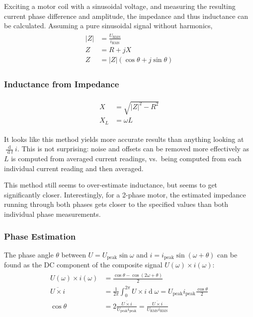 \documentclass[12pt,a4paper,oneside,openany]{article}
\DeclareMathOperator{\ud}{d}
\begin{document}
Exciting a motor coil with a sinusoidal voltage, and measuring the resulting current phase difference and amplitude, the impedance and thus inductance can be calculated. Assuming a pure sinusoidal signal without harmonics,
\begin{gather}
\begin{aligned}
|Z| &= \frac{U_{\textrm{RMS}}}{i_{\textrm{RMS}}} \\
Z &= R + j X \\
Z &= |Z| \left(\cos \theta + j \sin \theta \right)
\end{aligned}
\end{gather}

\subsubsection{Inductance from Impedance}

\begin{gather}
\begin{aligned}
X &= \sqrt{|Z|^2 - R^2} \\
X_L &= \omega L
\end{aligned}
\end{gather}

It looks like this method yields more accurate results than anything looking at $\frac{\ud}{\ud t} i$. This is not surprising: noise and offsets can be removed more effectively as $L$ is computed from averaged current readings, vs.\ being computed from each individual current reading and then averaged.

This method still seems to over-estimate inductance, but seems to get significantly closer. Interestingly, for a 2-phase motor, the estimated impedance running through both phases gets closer to the specified values than both individual phase measurements.

\subsubsection{Phase Estimation}

The phase angle $\theta$ between $U=U_{\textrm{peak}}\sin \omega$ and $i=i_{\textrm{peak}}\sin \left(\omega+\theta\right)$ can be found as the DC component of the composite signal $U(\omega) \times i(\omega)$:
\begin{gather}
\begin{aligned}
U(\omega) \times i(\omega) &= \frac{\cos \theta - \cos\left(2\omega+\theta\right)}{2} \\
\overline{U \times i} &= \frac{1}{2\pi}\int_0^{2\pi} U \times i \ud \omega = U_{\textrm{peak}} i_{\textrm{peak}}\frac{\cos \theta}{2} \\
\cos \theta &= 2 \frac{\overline{U \times i}}{U_{\textrm{peak}} i_{\textrm{peak}}} =\frac{\overline{U \times i}}{U_{\textrm{RMS}} i_{\textrm{RMS}}}
\end{aligned}
\end{gather}
\end{document}
